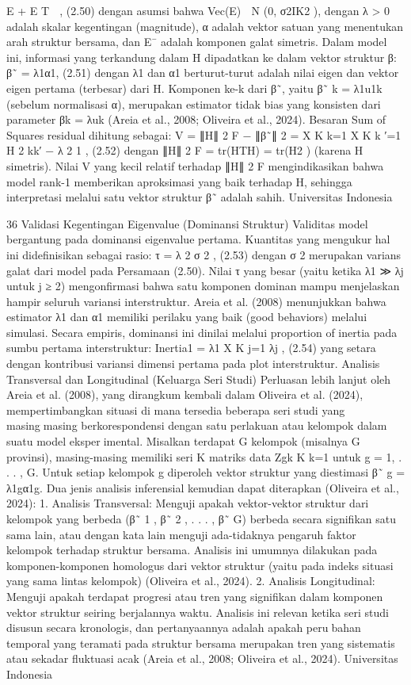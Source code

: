 E + E
T

, (2.50)
dengan asumsi bahwa Vec(E) ∼ N (0, σ2IK2 ), dengan λ > 0 adalah skalar kegentingan
(magnitude), α adalah vektor satuan yang menentukan arah struktur bersama, dan E¯ adalah
komponen galat simetris.
Dalam model ini, informasi yang terkandung dalam H dipadatkan ke dalam vektor
struktur β:
β˜ = λ1α1, (2.51)
dengan λ1 dan α1 berturut-turut adalah nilai eigen dan vektor eigen pertama (terbesar)
dari H. Komponen ke-k dari β˜, yaitu β˜
k = λ1u1k (sebelum normalisasi α), merupakan
estimator tidak bias yang konsisten dari parameter βk = λuk (Areia et al., 2008; Oliveira
et al., 2024).
Besaran Sum of Squares residual dihitung sebagai:
V = ∥H∥
2
F − ∥β˜∥
2 =
X
K
k=1
X
K
k
′=1
H
2
kk′ − λ
2
1
, (2.52)
dengan ∥H∥
2
F = tr(HTH) = tr(H2
) (karena H simetris). Nilai V yang kecil relatif
terhadap ∥H∥
2
F mengindikasikan bahwa model rank-1 memberikan aproksimasi yang baik
terhadap H, sehingga interpretasi melalui satu vektor struktur β˜ adalah sahih.
Universitas Indonesia

36
Validasi Kegentingan Eigenvalue (Dominansi Struktur)
Validitas model bergantung pada dominansi eigenvalue pertama. Kuantitas yang
mengukur hal ini didefinisikan sebagai rasio:
τ =
λ
2
σ
2
, (2.53)
dengan σ
2 merupakan varians galat dari model pada Persamaan (2.50). Nilai τ yang
besar (yaitu ketika λ1 ≫ λj untuk j ≥ 2) mengonfirmasi bahwa satu komponen dominan
mampu menjelaskan hampir seluruh variansi interstruktur. Areia et al. (2008) menunjukkan
bahwa estimator λ1 dan α1 memiliki perilaku yang baik (good behaviors) melalui simulasi.
Secara empiris, dominansi ini dinilai melalui proportion of inertia pada sumbu pertama
interstruktur:
Inertia1 =
λ1
X
K
j=1
λj
, (2.54)
yang setara dengan kontribusi variansi dimensi pertama pada plot interstruktur.
Analisis Transversal dan Longitudinal (Keluarga Seri Studi)
Perluasan lebih lanjut oleh Areia et al. (2008), yang dirangkum kembali dalam Oliveira
et al. (2024), mempertimbangkan situasi di mana tersedia beberapa seri studi yang masingmasing berkorespondensi dengan satu perlakuan atau kelompok dalam suatu model eksperimental. Misalkan terdapat G kelompok (misalnya G provinsi), masing-masing memiliki
seri K matriks data {Zgk}
K
k=1 untuk g = 1, . . . , G. Untuk setiap kelompok g diperoleh
vektor struktur yang diestimasi β˜
g = λ1gα1g. Dua jenis analisis inferensial kemudian
dapat diterapkan (Oliveira et al., 2024):
1. Analisis Transversal: Menguji apakah vektor-vektor struktur dari kelompok yang
berbeda (β˜
1
, β˜
2
, . . . , β˜
G) berbeda secara signifikan satu sama lain, atau dengan kata
lain menguji ada-tidaknya pengaruh faktor kelompok terhadap struktur bersama.
Analisis ini umumnya dilakukan pada komponen-komponen homologus dari vektor
struktur (yaitu pada indeks situasi yang sama lintas kelompok) (Oliveira et al., 2024).
2. Analisis Longitudinal: Menguji apakah terdapat progresi atau tren yang signifikan
dalam komponen vektor struktur seiring berjalannya waktu. Analisis ini relevan
ketika seri studi disusun secara kronologis, dan pertanyaannya adalah apakah perubahan temporal yang teramati pada struktur bersama merupakan tren yang sistematis
atau sekadar fluktuasi acak (Areia et al., 2008; Oliveira et al., 2024).
Universitas Indonesia

